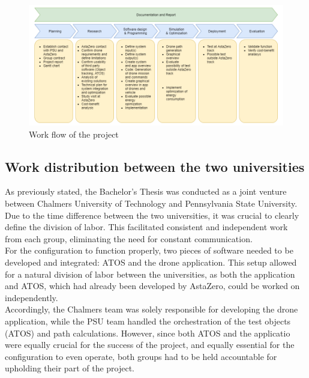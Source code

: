 \begin{figure}[H]
  \centering
  \includegraphics[width=\columnwidth]{figure/work_flow.png}
  \caption{Work flow of the project}
  \label{fig:workflow}
\end{figure}

\subsection{Work distribution between the two universities}
As previously stated, the Bachelor's Thesis was conducted as a joint venture between Chalmers University of Technology and Pennsylvania State University. Due to the time difference between the two universities, it was crucial to clearly define the division of labor. This facilitated consistent and independent work from each group, eliminating the need for constant communication.
\\

For the configuration to function properly, two pieces of software needed to be developed and integrated: ATOS and the drone application. This setup allowed for a natural division of labor between the universities, as both the application and ATOS, which had already been developed by AstaZero, could be worked on independently.
\\

Accordingly, the Chalmers team was solely responsible for developing the drone application, while the PSU team handled the orchestration of the test objects (ATOS) and path calculations. However, since both ATOS and the applicatio were equally crucial for the success of the project, and equally essential for the configuration to even operate, both groups had to be held accountable for upholding their part of the project.


